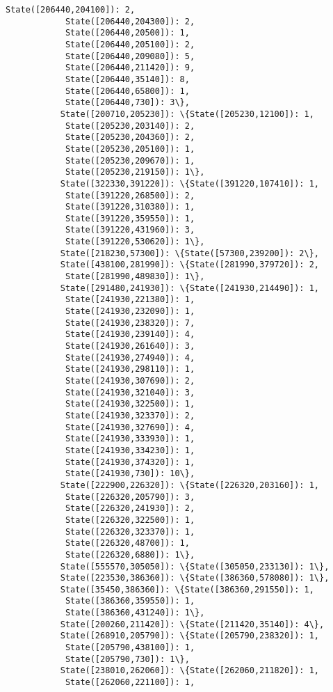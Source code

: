 \documentclass[11pt]{article}
\begin{document}
\begin{Verbatim}[commandchars=\\\{\}]
            State([206440,204100]): 2,
            State([206440,204300]): 2,
            State([206440,20500]): 1,
            State([206440,205100]): 2,
            State([206440,209080]): 5,
            State([206440,211420]): 9,
            State([206440,35140]): 8,
            State([206440,65800]): 1,
            State([206440,730]): 3\},
           State([200710,205230]): \{State([205230,12100]): 1,
            State([205230,203140]): 2,
            State([205230,204360]): 2,
            State([205230,205100]): 1,
            State([205230,209670]): 1,
            State([205230,219150]): 1\},
           State([322330,391220]): \{State([391220,107410]): 1,
            State([391220,268500]): 2,
            State([391220,310380]): 1,
            State([391220,359550]): 1,
            State([391220,431960]): 3,
            State([391220,530620]): 1\},
           State([218230,57300]): \{State([57300,239200]): 2\},
           State([438100,281990]): \{State([281990,379720]): 2,
            State([281990,489830]): 1\},
           State([291480,241930]): \{State([241930,214490]): 1,
            State([241930,221380]): 1,
            State([241930,232090]): 1,
            State([241930,238320]): 7,
            State([241930,239140]): 4,
            State([241930,261640]): 3,
            State([241930,274940]): 4,
            State([241930,298110]): 1,
            State([241930,307690]): 2,
            State([241930,321040]): 3,
            State([241930,322500]): 1,
            State([241930,323370]): 2,
            State([241930,327690]): 4,
            State([241930,333930]): 1,
            State([241930,334230]): 1,
            State([241930,374320]): 1,
            State([241930,730]): 10\},
           State([222900,226320]): \{State([226320,203160]): 1,
            State([226320,205790]): 3,
            State([226320,241930]): 2,
            State([226320,322500]): 1,
            State([226320,323370]): 1,
            State([226320,48700]): 1,
            State([226320,6880]): 1\},
           State([555570,305050]): \{State([305050,233130]): 1\},
           State([223530,386360]): \{State([386360,578080]): 1\},
           State([35450,386360]): \{State([386360,291550]): 1,
            State([386360,359550]): 1,
            State([386360,431240]): 1\},
           State([200260,211420]): \{State([211420,35140]): 4\},
           State([268910,205790]): \{State([205790,238320]): 1,
            State([205790,438100]): 1,
            State([205790,730]): 1\},
           State([238010,262060]): \{State([262060,211820]): 1,
            State([262060,221100]): 1,

\end{Verbatim}
\end{document}
